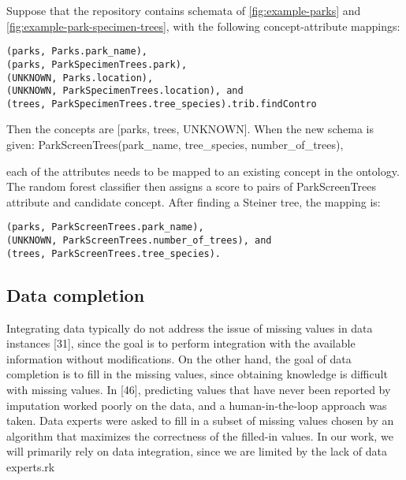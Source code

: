 Suppose that the repository contains schemata of \autoref{fig:example-parks} and \autoref{fig:example-park-specimen-trees}, with the following concept-attribute mappings:
\begin{lstlisting}
(parks, Parks.park_name),
(parks, ParkSpecimenTrees.park),
(UNKNOWN, Parks.location),
(UNKNOWN, ParkSpecimenTrees.location), and
(trees, ParkSpecimenTrees.tree_species).trib.findContro
\end{lstlisting}

Then the concepts are [parks, trees, UNKNOWN]. When the new schema is given:
ParkScreenTrees(park\_name, tree\_species, number\_of\_trees),

each of the attributes needs to be mapped to an existing concept in the ontology. The random forest classifier then assigns a score to pairs of ParkScreenTrees attribute and candidate concept. 
After finding a Steiner tree, the mapping is:
\begin{lstlisting}
(parks, ParkScreenTrees.park_name),
(UNKNOWN, ParkScreenTrees.number_of_trees), and
(trees, ParkScreenTrees.tree_species).
\end{lstlisting}

\subsection{Data completion}

Integrating data typically do not address the issue of missing values in data instances \cite{Miller2018MakingOD}[31], since the goal is to perform integration with the available information without modifications. On the other hand, the goal of data completion is to fill in the missing values, since obtaining knowledge is difficult with missing values. In \cite{Wilkinson2016FAIR}[46], predicting values that have never been reported by imputation worked poorly on the data, and a human-in-the-loop approach was taken. Data experts were asked to fill in a subset of missing values chosen by an algorithm that maximizes the correctness of the filled-in values. In our work, we will primarily rely on data integration, since we are limited by the lack of data experts.rk

